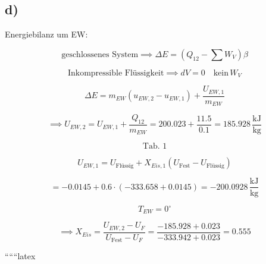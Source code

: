 

\subsection*{d)}

Energiebilanz um EW:

\[
\text{geschlossenes System} \implies \Delta E = \left( Q_{12} - \sum W_V \right) \beta
\]

\[
\text{Inkompressible Flüssigkeit} \implies dV = 0 \quad \text{kein} \, W_V
\]

\[
\Delta E = m_{EW} (u_{EW,2} - u_{EW,1}) + \frac{U_{EW,1}}{m_{EW}}
\]

\[
\implies U_{EW,2} = U_{EW,1} + \frac{Q_{12}}{m_{EW}} = 200.023 + \frac{11.5}{0.1} = 185.928 \, \frac{\text{kJ}}{\text{kg}}
\]

\[
\text{Tab. 1}
\]

\[
U_{EW,1} = U_{\text{Flüssig}} + X_{Eis,1} (U_{\text{Fest}} - U_{\text{Flüssig}})
\]

\[
= -0.0145 + 0.6 \cdot (-333.658 + 0.0145) = -200.0928 \, \frac{\text{kJ}}{\text{kg}}
\]

\[
T_{EW} = 0^\circ
\]

\[
\implies X_{Eis} = \frac{U_{EW,2} - U_{F}}{U_{\text{Fest}} - U_{F}} = \frac{-185.928 + 0.023}{-333.942 + 0.023} = 0.555
\]

``````latex